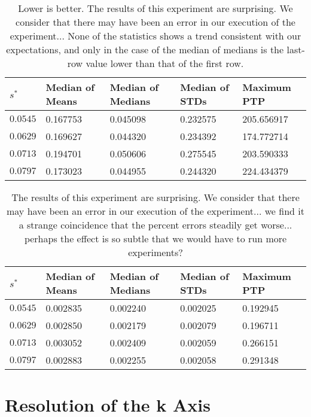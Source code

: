 \begin{table}[ht!]
\centering
\begin{tabular}{l|l|l|l|l}
\hline
$s^*$ & Median of Means & Median of Medians & Median of STDs & Maximum PTP \\ \hline
$0.0545$ & 0.167753 & 0.045098 & 0.232575 & 205.656917 \\
$0.0629$ & 0.169627 & 0.044320 & 0.234392 & 174.772714 \\
$0.0713$ & 0.194701 & 0.050606 & 0.275545 & 203.590333 \\
$0.0797$ & 0.173023 & 0.044955 & 0.244320 & 224.434379 \\
\end{tabular}
	\cprotect\caption[$s^*$ Experiment: Percent Error Statistics]{Lower is
		better. The
		results of this experiment are surprising. We consider that there
		may have been an error in our execution of the experiment...
		None of the statistics shows a trend consistent with our expectations,
		and only in the case of the median of medians is the last-row value
		lower than that of the first row.}
 \label{tab: minsep_experiment_delta_stats}
\end{table}

\begin{table}[ht!]
\centering
\begin{tabular}{l|l|l|l|l}
\hline
$s^*$ & Median of Means & Median of Medians & Median of STDs & Maximum PTP \\ \hline
$0.0545$ & 0.002835 & 0.002240 & 0.002025 & 0.192945 \\
$0.0629$ & 0.002850 & 0.002179 & 0.002079 & 0.196711 \\
$0.0713$ & 0.003052 & 0.002409 & 0.002059 & 0.266151 \\
$0.0797$ & 0.002883 & 0.002255 & 0.002058 & 0.291348 \\
\end{tabular}
	\cprotect\caption[$s^*$ Experiment: Percent Error Statistics]{The
		results of this experiment are surprising. We consider that there
		may have been an error in our execution of the experiment...
		we find it a strange coincidence that the percent errors steadily
		get worse... perhaps the effect is so subtle that we would have to
		run more experiments?}
 \label{tab: minsep_experiment_percerr_stats}
\end{table}

\section{Resolution of the k Axis}

